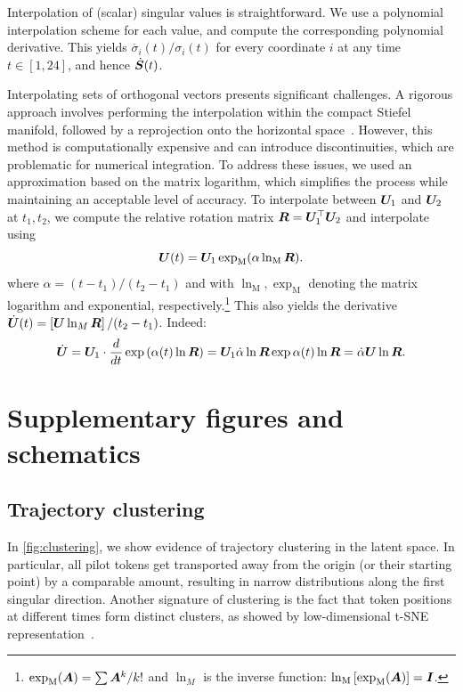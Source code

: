 \documentclass{article} %
\begin{document}
Interpolation of (scalar) singular values is straightforward. 
We use a polynomial interpolation scheme for each value, and compute the corresponding polynomial derivative.
This yields $\dot{\sigma_i}(t)/\sigma_i(t)$ for every coordinate $i$ at any time $t \in [1, 24]$, and hence $\dot{{\bm{S}}}(t)$.

Interpolating sets of orthogonal vectors presents significant challenges. A rigorous approach involves performing the interpolation within the compact Stiefel manifold, followed by a reprojection onto the horizontal space~\cite{PRAVEEN2023115971}. However, this method is computationally expensive and can introduce discontinuities, which are problematic for numerical integration. To address these issues, we used an approximation based on the matrix logarithm, which simplifies the process while maintaining an acceptable level of accuracy. 
To interpolate between ${\bm{U}}_1$ and ${\bm{U}}_2$ at $t_1, t_2$, we compute the relative rotation matrix ${\bm{R}} = {\bm{U}}_1^{\top} {\bm{U}}_2$ and interpolate using
\begin{equation}
    {\bm{U}}(t) = {\bm{U}}_1 \exp_\mathrm{M}(\alpha \ln_\mathrm{M}{{\bm{R}}}).
\end{equation}
where $\alpha = (t-t_1)/(t_2-t_1)$ and with $\ln_\mathrm{M}, \exp_\mathrm{M}$ denoting the matrix logarithm and exponential, respectively.\footnote{
$\exp_\mathrm{M} ({\bm{A}}) = \sum {\bm{A}}^k/k!$ and $\ln_M$ is the inverse function: $\ln_\mathrm{M} \left[ \exp_\mathrm{M} ({\bm{A}})\right] = {\bm{I}}$.
}
This also yields the derivative $\dot{{\bm{U}}}(t) = \left[ {\bm{U}} \ln_M{{\bm{R}}} \right] /(t_2 - t_1)$.
Indeed:
\begin{equation*}
    \dot{{\bm{U}}} = {\bm{U}}_1 \cdot \frac{d}{dt} \exp \left( \alpha(t) \ln{{\bm{R}}} \right)
    = {\bm{U}}_1 \dot{\alpha} \ln{{\bm{R}}} \exp{\alpha(t) \ln{{\bm{R}}}}
    = \dot{\alpha} {\bm{U}} \ln{{\bm{R}}}.
\end{equation*}


\section{Supplementary figures and schematics}
\label{app:supp-figures}

\subsection{Trajectory clustering}
\label{app:traj-clustering}

In \cref{fig:clustering}, we show evidence of trajectory clustering in the latent space.
In particular, all pilot tokens get transported away from the origin (or their starting point) by a comparable amount, resulting in narrow distributions along the first singular direction.
Another signature of clustering is the fact that token positions at different times form distinct clusters, as showed by low-dimensional t-SNE representation~\citep{JMLR:v9:vandermaaten08a}.
\end{document}
